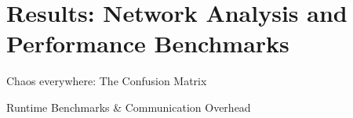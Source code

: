 \section{Results: Network Analysis and Performance Benchmarks}
\begin{frame}{Chaos everywhere: The Confusion Matrix}
  \centering
\end{frame}

\begin{frame}{Runtime Benchmarks \& Communication Overhead}
  \begin{table}[H]
    \centering
    \setlength{\belowcaptionskip}{0pt}
    \caption[Performance Benchmarks / Communication Overhead]{
      Performance benchmarks and communication overhead of the classification procedure on an Intel\textregistered \, i7-5600U CPU, including the encoding and decoding steps.
    }
\end{table}
\end{frame}
